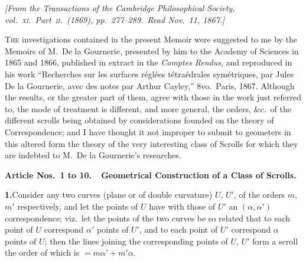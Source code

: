 \documentclass[11pt,a4paper]{article}
\begin{document}
\begin{center}
\textit{[From the \textit{Transactions of the Cambridge Philosophical Society},
vol.~\textsc{xi}.\ Part~\textsc{ii}.\ (1869), pp.~277--289.\
Read Nov.~11, 1867.]}
\end{center}

\medskip
\textsc{The} investigations contained in the present Memoir were suggested to
me by the Memoirs of M.\ De la Gournerie, presented by him to the Academy of
Sciences in 1865 and 1866, published in extract in the \textit{Comptes Rendus},
and reproduced in his work ``Recherches sur les surfaces r\'egl\'ees
t\'etra\'edrales sym\'etriques, par Jules De la Gournerie, avec des notes par
Arthur Cayley,'' 8vo.\ Paris, 1867. Although the results, or the greater part
of them, agree with those in the work just referred to, the mode of treatment
is different, and more general, the orders, \&c.\ of the different scrolls
being obtained by considerations founded on the theory of Correspondence; and
I have thought it not improper to submit to geometers in this altered form the
theory of the very interesting class of Scrolls for which they are indebted to
M.\ De la Gournerie's researches.

\medskip
\noindent\textbf{Article Nos.~1 to 10.\ \ Geometrical Construction of a Class
of Scrolls.}
\medskip

\textbf{1.}\quad Consider any two curves (plane or of double curvature) $U$,
$U'$, of the orders $m$, $m'$ respectively, and let the points of $U$ have with
those of $U'$ an $(\alpha, \alpha')$ correspondence; viz.\ let the points of the
two curves be so related that to each point of $U$ correspond $\alpha'$ points
of $U'$, and to each point of $U'$ correspond $\alpha$ points of $U$; then the
lines joining the corresponding points of $U$, $U'$ form a scroll the order of
which is $= m\alpha' + m'\alpha$.
\end{document}
